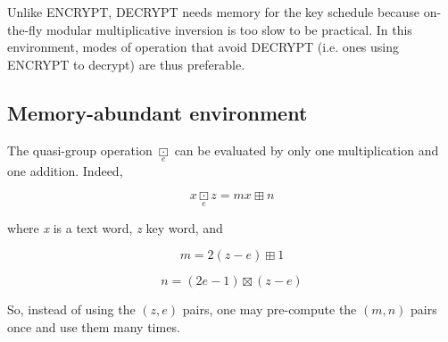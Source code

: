 \documentclass[a4paper,oneside,english]{amsart}
\numberwithin{equation}{section}
\numberwithin{figure}{section}
\begin{document}
Unlike ENCRYPT, DECRYPT needs memory for the key schedule because
on-the-fly modular multiplicative inversion is too slow to be practical.
In this environment, modes of operation that avoid DECRYPT (i.e. ones
using ENCRYPT to decrypt) are thus preferable.


\subsection{Memory-abundant environment}

The quasi-group operation $\underset{e}{\boxdot}$ can be evaluated
by only one multiplication and one addition. Indeed, 

\[
x\underset{e}{\boxdot}z=mx\boxplus n
\]


where \emph{x} is a text word, \emph{z} key word, and

\[
m=2(z-e)\boxplus1
\]


\[
n=(2e-1)\boxtimes(z-e)
\]


So, instead of using the $(z,e)$ pairs, one may pre-compute the $(m,n)$
pairs once and use them many times.
\end{document}
